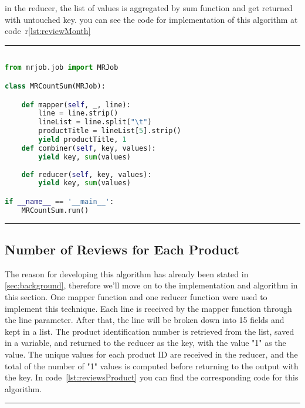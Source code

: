 in the reducer, the list of values is aggregated by sum function and get returned with untouched key. you can see the code for implementation of this algorithm at code~r\ref{lst:reviewMonth}

\rule{200 pt}{0.5 pt} 

\renewcommand{\lstlistingname}{Code}
\lstset{style=mystyle}
\begin{lstlisting}[language=Python, caption={Number of Reviews for each month}, label={lst:reviewMonth}, mathescape = true, breaklines=true]

from mrjob.job import MRJob

class MRCountSum(MRJob):

    def mapper(self, _, line):
        line = line.strip()  
        lineList = line.split("\t")
        productTitle = lineList[5].strip()
        yield productTitle, 1
    def combiner(self, key, values):
        yield key, sum(values)
        
    def reducer(self, key, values):
        yield key, sum(values)

if __name__ == '__main__':
    MRCountSum.run()

\end{lstlisting}

\rule{200 pt}{0.5 pt} 

\subsection{Number of Reviews for Each Product}
The reason for developing this algorithm has already been stated in \ref{sec:background}, therefore we'll move on to the implementation and algorithm in this section. One mapper function and one reducer function were used to implement this technique. Each line is received by the mapper function through the line parameter. After that, the line will be broken down into 15 fields and kept in a list. The product identification number is retrieved from the list, saved in a variable, and returned to the reducer as the key, with the value "1" as the value. The unique values for each product ID are received in the reducer, and the total of the number of "1" values is computed before returning to the output with the key. In code~\ref{lst:reviewsProduct} you can find the corresponding code for this algorithm.


\rule{200 pt}{0.5 pt} 

